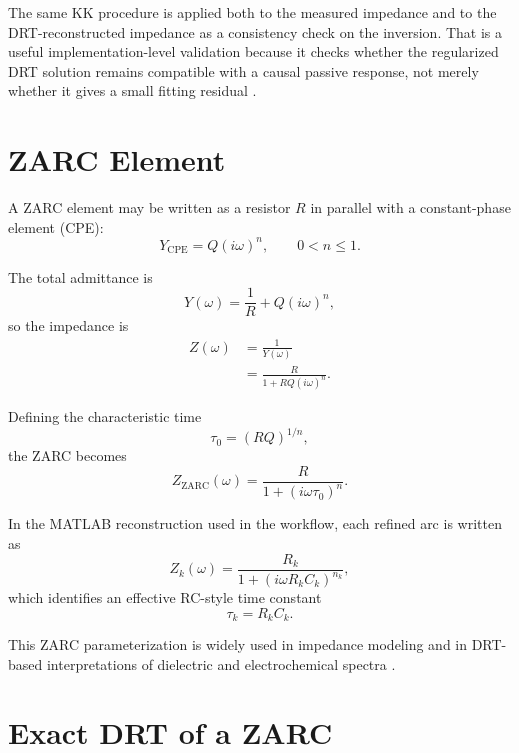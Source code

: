 \documentclass[11pt]{article}
\begin{document}
The same KK procedure is applied both to the measured impedance and to the DRT-reconstructed impedance as a consistency check on the inversion. That is a useful implementation-level validation because it checks whether the regularized DRT solution remains compatible with a causal passive response, not merely whether it gives a small fitting residual \cite{boukamp2017,ivertiffee2017}.

\section{ZARC Element}

A ZARC element may be written as a resistor $R$ in parallel with a constant-phase element (CPE):
\begin{equation}
Y_{\mathrm{CPE}} = Q (i\omega)^n,
\qquad 0 < n \le 1.
\end{equation}

The total admittance is
\begin{equation}
Y(\omega) = \frac{1}{R} + Q(i\omega)^n,
\end{equation}
so the impedance is
\begin{align}
Z(\omega)
&= \frac{1}{Y(\omega)} \\
&= \frac{R}{1 + RQ(i\omega)^n}.
\end{align}

Defining the characteristic time
\begin{equation}
\tau_0 = (RQ)^{1/n},
\end{equation}
the ZARC becomes
\begin{equation}
Z_{\mathrm{ZARC}}(\omega) = \frac{R}{1 + (i\omega\tau_0)^n}.
\end{equation}

In the MATLAB reconstruction used in the workflow, each refined arc is written as
\begin{equation}
Z_k(\omega) = \frac{R_k}{1 + (i\omega R_k C_k)^{n_k}},
\end{equation}
which identifies an effective RC-style time constant
\begin{equation}
\tau_k = R_k C_k.
\end{equation}

This ZARC parameterization is widely used in impedance modeling and in DRT-based interpretations of dielectric and electrochemical spectra \cite{cordoba2018,ivertiffee2017,boukamp2017}.

\section{Exact DRT of a ZARC}
\end{document}
